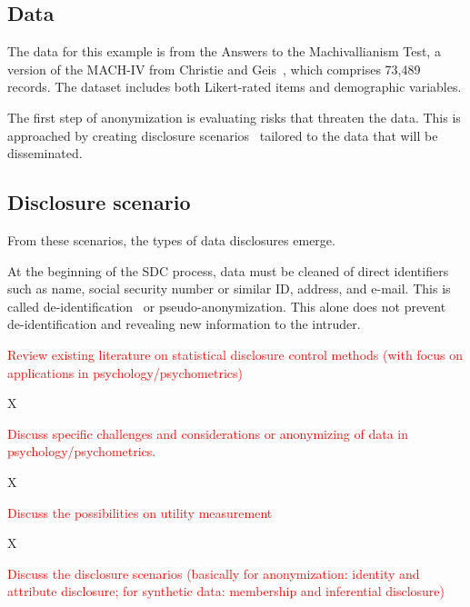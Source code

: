 \documentclass{article}
\begin{document}
\subsection{Data}
The data for this example is from the Answers to the Machivallianism Test, a version of the MACH-IV from Christie and Geis~\cite{Data}, which comprises 73,489 records.
The dataset includes both Likert-rated items and demographic variables.









\vspace{20\baselineskip}




The first step of anonymization is evaluating risks that threaten the data. This is approached by creating disclosure scenarios~\cite{2012_Hundepool} tailored to the data that will be disseminated. 



\subsection{Disclosure scenario}

From these scenarios, the types of data disclosures emerge.

At the beginning of the SDC process, data must be cleaned of direct identifiers such as name, social security number or similar ID, address, and e-mail. This is called de-identification~\cite{2001_Duncan} or pseudo-anonymization. This alone does not prevent de-identification and revealing new information to the intruder.

\textcolor{red}{Review existing literature on statistical disclosure control methods (with focus on applications in psychology/psychometrics)}

X

\textcolor{red}{Discuss specific challenges and considerations or anonymizing of data in psychology/psychometrics.}

X

\textcolor{red}{Discuss the possibilities on utility measurement}

X

\textcolor{red}{Discuss the disclosure scenarios (basically for anonymization: identity and attribute disclosure; for synthetic data: membership and inferential disclosure)}
\end{document}
